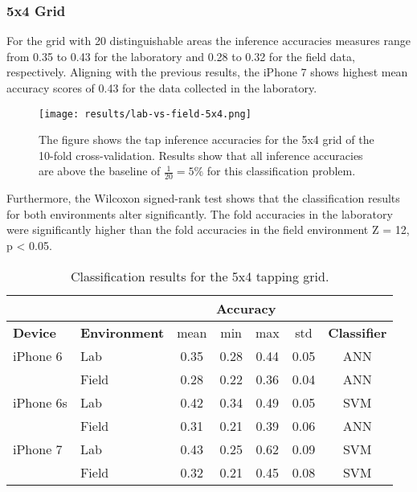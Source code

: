 \subsubsection{5x4 Grid}
For the grid with 20 distinguishable areas the inference accuracies measures range from 0.35 to 0.43 for the laboratory and 0.28 to 0.32 for the field data, respectively. Aligning with the previous results, the iPhone 7 shows highest mean accuracy scores of 0.43 for the data collected in the laboratory. 

\begin{figure}[h!]
  \centering
  \texttt{[image: results/lab-vs-field-5x4.png]}
  \caption{The figure shows the tap inference accuracies for the 5x4 grid of the 10-fold cross-validation. Results show that all inference accuracies are above the baseline of $\frac{1}{20} = 5\%$ for this classification problem.} \label{fig:results-lf-5x4}
\end{figure}



Furthermore, the Wilcoxon signed-rank test shows that the classification results for both environments alter significantly. The fold accuracies in the laboratory were significantly higher than the fold accuracies in the field environment Z = 12, p < 0.05.

\begin{table}[h!]
  \centering
  \begin{tabular}{|l|l|c|c|c|c|c|}
    \cline{3-6}
    \multicolumn{2}{c}{} & \multicolumn{4}{|c|}{\textbf{Accuracy}}  \\
    \hline
    \textbf{Device} & \textbf{Environment} & mean &   min &   max  & std &  \textbf{Classifier} \\
    \hline
    iPhone 6 & Lab &      0.35 &     0.28 &     0.44 &     0.05 &  ANN \\
    & Field &      0.28 &     0.22 &     0.36 &     0.04 &  ANN \\
    \hline
    iPhone 6s & Lab &      0.42 &     0.34 &     0.49 &     0.05 &  SVM \\
    &   Field    &    0.31 &     0.21 &     0.39 &     0.06 &  ANN \\
    \hline
    iPhone 7 & Lab &      0.43 &     0.25 &     0.62 &     0.09 &  SVM \\
    & Field &      0.32 &     0.21 &     0.45 &     0.08 &  SVM \\    
    \hline
  \end{tabular}
  \caption{Classification results for the 5x4 tapping grid.}
\end{table}


